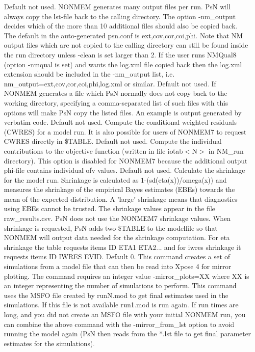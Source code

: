 \begin{optionlist}
Default not used.  NONMEM generates many output files per run. 
PsN will always copy the lst-file back to the calling directory. The option -nm\_output decides which of the more than 10 additional files should also be copied back. The default in the auto-generated psn.conf is ext,cov,cor,coi,phi. 
Note that NM output files which are not copied to the calling directory can still be found inside the run directory
unless -clean is set larger than 2. If the user runs NMQual8 (option -nmqual is set) and wants the log.xml file copied back then the log.xml extension should be included in the -nm\_output list, i.e. nm\_output=ext,cov,cor,coi,phi,log.xml or similar.
\nextopt
{}
Default not used. If NONMEM generates a file which PsN normally does not copy back to the working directory, specifying a comma-separated list of such files with this options will make PsN copy the listed files. An example is output generated by verbatim code. 
\nextopt
{}
Default not used. Compute the conditional weighted residuals (CWRES) for a model run. It is also possible for users of NONMEM7 to request CWRES directly in \$TABLE. 
\nextopt
{}
Default not used. Compute the individual contributions to the objective function (written in file iotab$<$N$>$ in NM\_run directory). This option is disabled for NONMEM7 because the additional output phi-file contains individual ofv values. 
\nextopt
{}
Default not used. Calculate the shrinkage for the model run.  Shrinkage is calculated as 1-(sd(eta(x))/omega(x)) and measures the shrinkage of the empirical Bayes estimates (EBEs) towards the mean of the expected distribution.  A 'large' shrinkage means that diagnostics using EBEs cannot be trusted. The shrinkage values appear in the file raw\_results.csv. 
PsN does not use the NONMEM7 shrinkage values. When shrinkage is requested, PsN adds two \$TABLE to the modelfile so that NONMEM will output data needed for the shrinkage computation. For eta shrinkage the table requests items ID ETA1 ETA2... and for iwres shrinkage it requests items ID IWRES EVID. 
\nextopt
{}
Default 0. This command creates a set of simulations from a model file that can then be read into Xpose 4 for mirror plotting. The command requires an integer value -mirror\_plots=XX where XX is an integer representing the number of simulations to perform. This command uses the MSFO file created by runN.mod to get final estimates used in the simulations. If this file is not available run1.mod is run again.  If run times are long, and you did not create an MSFO file with your initial NONMEM run, you can combine the above command with the -mirror\_from\_lst option to avoid running the model again (PsN then reads from the *.lst file to get final parameter estimates for the simulations). 

\end{optionlist}
